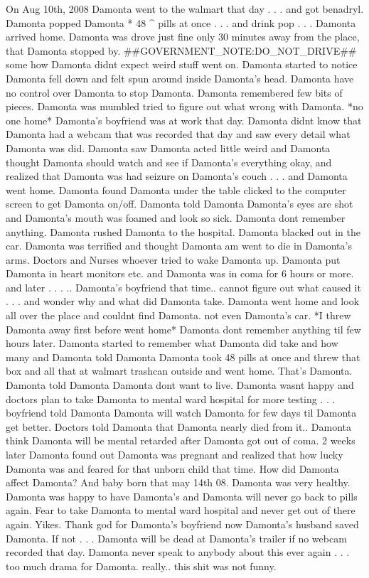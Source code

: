 \documentclass[12pt]{book}
\begin{document}
On Aug 10th, 2008 Damonta went to the walmart that day . . .  and got benadryl. Damonta popped Damonta * 48 ^ pills at once . . .  and drink pop . . .  Damonta arrived home. Damonta was drove just fine only 30 minutes away from the place, that Damonta stopped by. \#\#GOVERNMENT\_NOTE:DO\_NOT\_DRIVE\#\# some how Damonta didnt expect weird stuff went on. Damonta started to notice Damonta fell down and felt spun around inside Damonta's head. Damonta have no control over Damonta to stop Damonta. Damonta remembered few bits of pieces. Damonta was mumbled tried to figure out what wrong with Damonta. *no one home* Damonta's boyfriend was at work that day. Damonta didnt know that Damonta had a webcam that was recorded that day and saw every detail what Damonta was did. Damonta saw Damonta acted little weird and Damonta thought Damonta should watch and see if Damonta's everything okay, and realized that Damonta was had seizure on Damonta's couch . . .  and Damonta went home. Damonta found Damonta under the table clicked to the computer screen to get Damonta on/off. Damonta told Damonta Damonta's eyes are shot and Damonta's mouth was foamed and look so sick. Damonta dont remember anything. Damonta rushed Damonta to the hospital. Damonta blacked out in the car. Damonta was terrified and thought Damonta am went to die in Damonta's arms. Doctors and Nurses whoever tried to wake Damonta up. Damonta put Damonta in heart monitors etc. and Damonta was in coma for 6 hours or more. and later . . . .. Damonta's boyfriend that time.. cannot figure out what caused it . . .  and wonder why and what did Damonta take. Damonta went home and look all over the place and couldnt find Damonta. not even Damonta's car. *I threw Damonta away first before went home* Damonta dont remember anything til few hours later. Damonta started to remember what Damonta did take and how many and Damonta told Damonta Damonta took 48 pills at once and threw that box and all that at walmart trashcan outside and went home. That's Damonta. Damonta told Damonta Damonta dont want to live. Damonta wasnt happy and doctors plan to take Damonta to mental ward hospital for more testing . . .  boyfriend told Damonta Damonta will watch Damonta for few days til Damonta get better. Doctors told Damonta that Damonta nearly died from it.. Damonta think Damonta will be mental retarded after Damonta got out of coma. 2 weeks later Damonta found out Damonta was pregnant and realized that how lucky Damonta was and feared for that unborn child that time. How did Damonta affect Damonta? And baby born that may 14th 08. Damonta was very healthy. Damonta was happy to have Damonta's and Damonta will never go back to pills again. Fear to take Damonta to mental ward hospital and never get out of there again. Yikes. Thank god for Damonta's boyfriend now Damonta's husband saved Damonta. If not . . .  Damonta will be dead at Damonta's trailer if no webcam recorded that day. Damonta never speak to anybody about this ever again . . .  too much drama for Damonta. really.. this shit was not funny.
\end{document}
